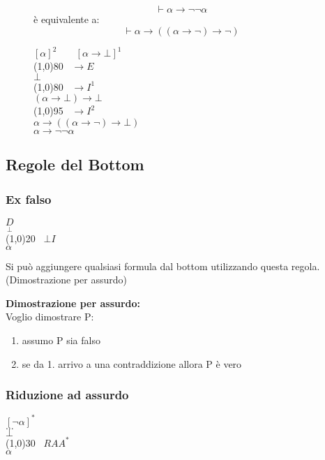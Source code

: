 \documentclass{article}
\theoremstyle{break}
\theoremstyle{break}
\theoremstyle{break}
\theoremstyle{break}
\begin{document}
\begin{figure}[H]
  \begin{example}
    \[
      \vdash \alpha \to \neg \neg \alpha 
    \] 
    è equivalente a:
    \[
      \vdash \alpha \to ((\alpha \to \neg) \to \neg)
    \] 
    \begin{center}
      \( [\alpha]^2 \;\;\;\;\;\;\; [\alpha \to  \bot]^1 \) \\
      \hspace{1cm}\line(1,0){80}\(\;\;\; \to E\)\\
      \( \bot\) \\
      \hspace{1cm}\line(1,0){80}\(\;\;\; \to I^1 \)\\
      \( (\alpha \to \bot) \to \bot\) \\
      \hspace{1cm}\line(1,0){95}\(\;\;\; \to I^2 \)\\
      \( \alpha \to ((\alpha \to \neg) \to \bot) \) \\
      \( \alpha \to \neg \neg \alpha \) 
    \end{center}
  \end{example}
\end{figure}

\subsection{Regole del Bottom}
\subsubsection{Ex falso}
\begin{center}
  \(
  \underset{\bot}{D}
  \)\\ 
  \hspace{0.8cm}\line(1,0){20}\(\;\;\; \bot I \)\\  
  \(
  \alpha
  \)
\end{center}
Si può aggiungere qualsiasi formula dal bottom utilizzando questa regola. (Dimostrazione per assurdo)

\vspace{0.5cm}
\textbf{Dimostrazione per assurdo:}\\
Voglio dimostrare P:
\begin{enumerate}
  \item assumo P sia falso
  \item se da 1. arrivo a una contraddizione allora P è vero
\end{enumerate}
\subsubsection{Riduzione ad assurdo}
\begin{center}
  \(
  [\neg \alpha]^* 
  \)\\ 
  \( \ldots \) \\
  \( \bot \) \\
  \hspace{1.2cm}\line(1,0){30}\(\;\;\; RAA^* \)\\  
  \(
  \alpha
  \)
\end{center}
\end{document}
